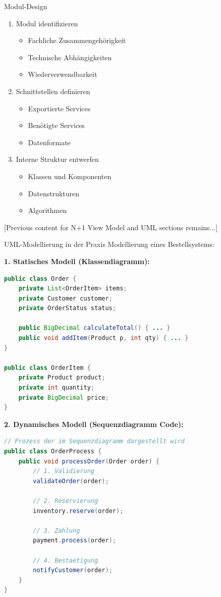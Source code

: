 \begin{KR}{Modul-Design}
\begin{enumerate}
    \item Modul identifizieren
    \begin{itemize}
        \item Fachliche Zusammengehörigkeit
        \item Technische Abhängigkeiten
        \item Wiederverwendbarkeit
    \end{itemize}
    
    \item Schnittstellen definieren
    \begin{itemize}
        \item Exportierte Services
        \item Benötigte Services
        \item Datenformate
    \end{itemize}
    
    \item Interne Struktur entwerfen
    \begin{itemize}
        \item Klassen und Komponenten
        \item Datenstrukturen
        \item Algorithmen
    \end{itemize}
\end{enumerate}
\end{KR}

[Previous content for N+1 View Model and UML sections remains...]

\begin{example}{UML-Modellierung in der Praxis}
Modellierung eines Bestellsystems:

\textbf{1. Statisches Modell (Klassendiagramm):}
\begin{lstlisting}[language=Java]
public class Order {
    private List<OrderItem> items;
    private Customer customer;
    private OrderStatus status;
    
    public BigDecimal calculateTotal() { ... }
    public void addItem(Product p, int qty) { ... }
}

public class OrderItem {
    private Product product;
    private int quantity;
    private BigDecimal price;
}
\end{lstlisting}

\textbf{2. Dynamisches Modell (Sequenzdiagramm Code):}
\begin{lstlisting}[language=Java]
// Prozess der im Sequenzdiagramm dargestellt wird
public class OrderProcess {
    public void processOrder(Order order) {
        // 1. Validierung
        validateOrder(order);
        
        // 2. Reservierung
        inventory.reserve(order);
        
        // 3. Zahlung
        payment.process(order);
        
        // 4. Bestaetigung
        notifyCustomer(order);
    }
}
\end{lstlisting}
\end{example}


